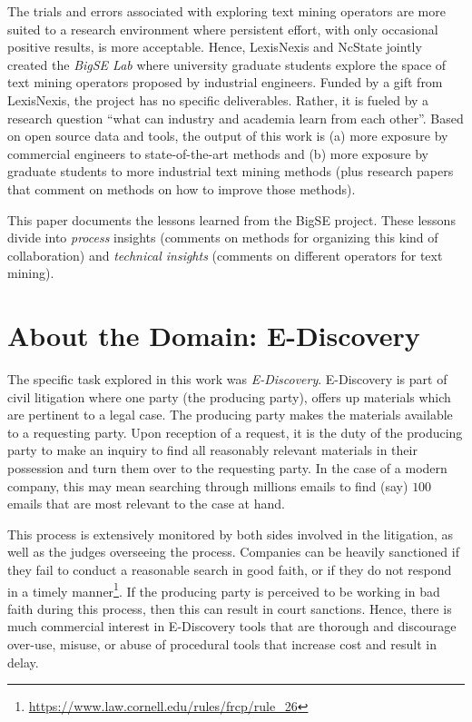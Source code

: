 \documentclass{sig-alternate-05-2015}
\theoremstyle{break}
\begin{document}
The trials and errors associated with exploring text mining operators
are more suited to a research environment where persistent effort, with only occasional positive results, is more acceptable. Hence,
LexisNexis and NcState jointly created the {\em BigSE Lab}  where
university graduate students explore    the space of text mining
operators proposed by 
industrial engineers.  Funded by a gift from LexisNexis, the project has no specific deliverables. Rather, it is fueled by a research question ``what can
  industry and academia learn from each other''. Based on open source
  data and tools, the output of this work is (a) more exposure by commercial engineers to state-of-the-art methods and (b) more
  exposure by graduate students
    to more industrial text mining methods (plus research
  papers that comment on methods on how to improve  those methods).





This paper documents the lessons learned from the BigSE project. 
These lessons divide into {\em process} insights (comments
on methods for organizing this kind of collaboration) and {\em technical
insights} (comments on different operators for text mining).
 
 
  
   


\section{About the Domain: E-Discovery}

The specific  task explored in this work was {\em E-Discovery}.
E-Discovery is part of  civil litigation where one party (the producing party), offers up   materials which are pertinent to a  legal case. The producing party makes the materials available to a requesting party.
Upon reception of a request, it is the duty of the producing party to make an inquiry to find all reasonably relevant materials in their possession and turn them over to the requesting party.
In the case of a modern company, this may mean searching through 
millions emails to find (say) $100$ emails that are most relevant to the case at hand.
  
This process is extensively monitored by both sides involved in the litigation,
as well as the judges overseeing the process. Companies can be heavily sanctioned if
they fail to conduct a reasonable search in good faith, or if they do not respond in a timely
manner\footnote{\url{https://www.law.cornell.edu/rules/frcp/rule_26}}. If the producing party is perceived to be working in bad faith during this process, then this
can result in court sanctions. Hence, there is much commercial interest in 
E-Discovery tools that  are thorough and discourage over-use, misuse,   or abuse of procedural tools that increase cost and result in delay.
\end{document}
